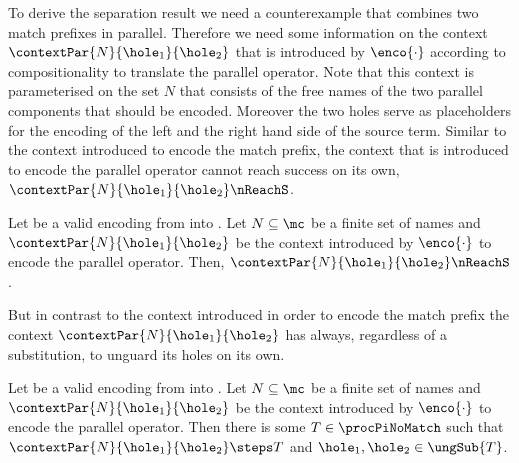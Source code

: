 \documentclass[final,copyright,creativecommons]{eptcs}
\begin{document}
To derive the separation result we need a counterexample that combines two match prefixes in parallel.
Therefore we need some information on the context $ \contextPar{N}{\hole_1}{\hole_2} $ that is introduced by $ \enco{\cdot} $ according to compositionality to translate the parallel operator. Note that this context is parameterised on the set $ N $ that consists of the free names of the two parallel components that should be encoded. Moreover the two holes serve as placeholders for the encoding of the left and the right hand side of the source term.
Similar to the context introduced to encode the match prefix, the context that is introduced to encode the parallel operator cannot reach success on its own, \ie $ \contextPar{N}{\hole_1}{\hole_2} \nReachS $.

\begin{lemma}
	\label{lem:parContextCannotReachSuccess}
	Let \encod be a valid encoding from \piT into \piNM.
	Let $ N \subseteq \mc $ be a finite set of names
	and $ \contextPar{N}{\hole_1}{\hole_2} $ be the context introduced by $ \enco{\cdot} $ to encode the parallel operator.
	Then, $ \contextPar{N}{\hole_1}{\hole_2} \nReachS $.
\end{lemma}

But in contrast to the context introduced in order to encode the match prefix the context $ \contextPar{N}{\hole_1}{\hole_2} $ has always, \ie regardless of a substitution, to unguard its holes on its own.

\begin{lemma}
	\label{lem:parContextUnguard}
	Let \encod be a valid encoding from \piT into \piNM.
	Let $ N \subseteq \mc $ be a finite set of names
	and $ \contextPar{N}{\hole_1}{\hole_2} $ be the context introduced by $ \enco{\cdot} $ to encode the parallel operator.
	Then there is some $ T \in \procPiNoMatch $ such that $ \contextPar{N}{\hole_1}{\hole_2} \steps T $ and $ \hole_1, \hole_2 \in \ungSub{T} $.
\end{lemma}
\end{document}
